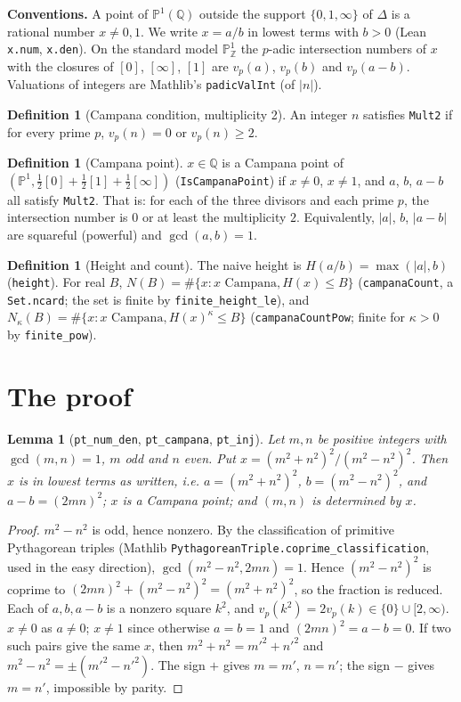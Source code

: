 \documentclass[11pt]{article}
\newtheorem{lemma}[theorem]{Lemma}
\theoremstyle{definition}
\newtheorem{definition}[theorem]{Definition}
\begin{document}
\textbf{Conventions.} A point of $\mathbb{P}^1(\mathbb{Q})$ outside the support $\{0,1,\infty\}$ of
$\Delta$ is a rational number $x\neq 0,1$. We write $x=a/b$ in lowest terms with $b>0$ (Lean
\texttt{x.num}, \texttt{x.den}). On the standard model $\mathbb{P}^1_{\mathbb{Z}}$ the $p$-adic
intersection numbers of $x$ with the closures of $[0]$, $[\infty]$, $[1]$ are $v_p(a)$, $v_p(b)$ and
$v_p(a-b)$. Valuations of integers are Mathlib's \texttt{padicValInt} (of $|n|$).

\begin{definition}[Campana condition, multiplicity 2]
An integer $n$ satisfies \texttt{Mult2} if for every prime $p$, $v_p(n)=0$ or $v_p(n)\ge 2$.
\end{definition}

\begin{definition}[Campana point]
$x\in\mathbb{Q}$ is a Campana point of $(\mathbb{P}^1,\tfrac12[0]+\tfrac12[1]+\tfrac12[\infty])$
(\texttt{IsCampanaPoint}) if $x\neq0$, $x\neq1$, and $a$, $b$, $a-b$ all satisfy \texttt{Mult2}. That
is: for each of the three divisors and each prime $p$, the intersection number is $0$ or at least the
multiplicity $2$. Equivalently, $|a|$, $b$, $|a-b|$ are squareful (powerful) and $\gcd(a,b)=1$.
\end{definition}

\begin{definition}[Height and count]
The naive height is $H(a/b)=\max(|a|,b)$ (\texttt{height}). For real $B$,
$N(B)=\#\{x : x \text{ Campana}, H(x)\le B\}$ (\texttt{campanaCount}, a \texttt{Set.ncard}; the set is
finite by \texttt{finite\_height\_le}), and
$N_\kappa(B)=\#\{x : x \text{ Campana}, H(x)^\kappa\le B\}$ (\texttt{campanaCountPow}; finite for
$\kappa>0$ by \texttt{finite\_pow}).
\end{definition}

\section{The proof}

\begin{lemma}[\texttt{pt\_num\_den}, \texttt{pt\_campana}, \texttt{pt\_inj}]
Let $m,n$ be positive integers with $\gcd(m,n)=1$, $m$ odd and $n$ even. Put
$x=(m^2+n^2)^2/(m^2-n^2)^2$. Then $x$ is in lowest terms as written, i.e. $a=(m^2+n^2)^2$,
$b=(m^2-n^2)^2$, and $a-b=(2mn)^2$; $x$ is a Campana point; and $(m,n)$ is determined by $x$.
\end{lemma}

\begin{proof}
$m^2-n^2$ is odd, hence nonzero. By the classification of primitive Pythagorean triples (Mathlib
\texttt{PythagoreanTriple.coprime\_classification}, used in the easy direction),
$\gcd(m^2-n^2,2mn)=1$. Hence $(m^2-n^2)^2$ is coprime to $(2mn)^2+(m^2-n^2)^2=(m^2+n^2)^2$, so the
fraction is reduced. Each of $a,b,a-b$ is a nonzero square $k^2$, and $v_p(k^2)=2v_p(k)\in\{0\}\cup[2,\infty)$.
$x\neq0$ as $a\neq0$; $x\neq1$ since otherwise $a=b=1$ and $(2mn)^2=a-b=0$. If two such pairs give
the same $x$, then $m^2+n^2=m'^2+n'^2$ and $m^2-n^2=\pm(m'^2-n'^2)$. The sign $+$ gives $m=m'$,
$n=n'$; the sign $-$ gives $m=n'$, impossible by parity.
\end{proof}
\end{document}
